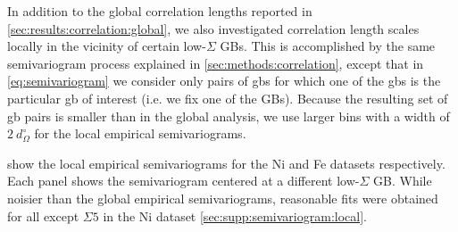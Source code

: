 \documentclass[final,twocolumn,12pt]{elsarticle}
\begin{document}
    In addition to the global correlation lengths reported in \cref{sec:results:correlation:global}, we also investigated correlation length scales locally in the vicinity of certain low-$\Sigma$ GBs. This is accomplished by the same semivariogram process explained in \cref{sec:methods:correlation}, except that in \cref{eq:semivariogram} we consider only pairs of \glspl{gb} for which one of the \glspl{gb} is the particular \gls{gb} of interest (i.e. we fix one of the GBs). Because the resulting set of \gls{gb} pairs is smaller than in the global analysis, we use larger bins with a width of $2\ d_{\Omega}^{\circ}$ for the local empirical semivariograms.
    
     show the local empirical semivariograms for the Ni and Fe datasets respectively. Each panel shows the semivariogram centered at a different low-$\Sigma$ GB. While noisier than the global empirical semivariograms, reasonable fits were obtained for all except $\Sigma 5$ in the Ni dataset \cref{sec:supp:semivariogram:local}.
    
    
\end{document}
